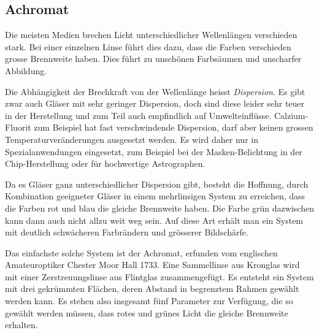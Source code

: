 %
%
%
\subsection{Achromat\label{mo:subsection:achromat}}
Die meisten Medien brechen Licht unterschiedlicher Wellenlängen
verschieden stark.
Bei einer einzelnen Linse führt dies dazu, dass die Farben
verschieden grosse Brennweite haben.
Dies führt zu unschönen Farbsäumen und unscharfer Abbildung.

Die Abhängigkeit der Brechkraft von der Wellenlänge heisst {\em Dispersion}.
Es gibt zwar auch Gläser mit sehr geringer Dispersion, doch sind diese
leider sehr teuer in der Herstellung und zum Teil auch empfindlich
auf Umwelteinflüsse.
Calzium-Fluorit zum Beispiel hat fast verschwindende Dispersion, darf
aber keinen grossen Temperaturveränderungen ausgesetzt werden.
Es wird daher nur in Spezialanwendungen eingesetzt, zum Beispiel bei
der Masken-Belichtung in der Chip-Herstellung oder für hochwertige 
Astrographen.

Da es Gläser ganz unterschiedlicher Dispersion gibt, besteht die Hoffnung,
durch Kombination geeigneter Gläser in einem mehrlinsigen System zu
erreichen, dass die Farben rot und blau die gleiche Brennweite haben.
Die Farbe grün dazwischen kann dann auch nicht allzu weit weg sein.
Auf diese Art erhält man ein System mit deutlich schwächeren Farbrändern
und grösserer Bildschärfe.

Das einfachste solche System ist der Achromat, erfunden vom  englischen
Amateuroptiker Chester Moor Hall 1733.
Eine Sammellinse aus Kronglas wird mit einer Zerstreuungslinse aus
Flintglas zusammengefügt.
Es entsteht ein System mit drei gekrümmten Flächen, deren Abstand
in begrenztem Rahmen gewählt werden kann.
Es stehen also insgesamt fünf Parameter zur Verfügung, die so gewählt
werden müssen, dass rotes und grünes Licht die gleiche Brennweite
erhalten.

